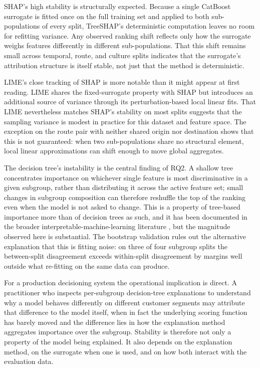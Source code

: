 \documentclass[oneside]{memoir} %
\begin{document}
SHAP's high stability is structurally expected. Because a single CatBoost surrogate is fitted once on the full training set and applied to both sub-populations of every split, TreeSHAP's deterministic computation leaves no room for refitting variance. Any observed ranking shift reflects only how the surrogate weighs features differently in different sub-populations. That this shift remains small across temporal, route, and culture splits indicates that the surrogate's attribution structure is itself stable, not just that the method is deterministic.

LIME's close tracking of SHAP is more notable than it might appear at first reading. LIME shares the fixed-surrogate property with SHAP but introduces an additional source of variance through its perturbation-based local linear fits. That LIME nevertheless matches SHAP's stability on most splits suggests that the sampling variance is modest in practice for this dataset and feature space. The exception on the route pair with neither shared origin nor destination shows that this is not guaranteed: when two sub-populations share no structural element, local linear approximations can shift enough to move global aggregates.

The decision tree's instability is the central finding of RQ2. A shallow tree concentrates importance on whichever single feature is most discriminative in a given subgroup, rather than distributing it across the active feature set; small changes in subgroup composition can therefore reshuffle the top of the ranking even when the model is not asked to change. This is a property of tree-based importance more than of decision trees as such, and it has been documented in the broader interpretable-machine-learning literature \parencite{molnar_interpretable_2025, strobl_bias_2007}, but the magnitude observed here is substantial. The bootstrap validation rules out the alternative explanation that this is fitting noise: on three of four subgroup splits the between-split disagreement exceeds within-split disagreement by margins well outside what re-fitting on the same data can produce.

For a production decisioning system the operational implication is direct. A practitioner who inspects per-subgroup decision-tree explanations to understand why a model behaves differently on different customer segments may attribute that difference to the model itself, when in fact the underlying scoring function has barely moved and the difference lies in how the explanation method aggregates importance over the subgroup. Stability is therefore not only a property of the model being explained. It also depends on the explanation method, on the surrogate when one is used, and on how both interact with the evaluation data.
\end{document}
